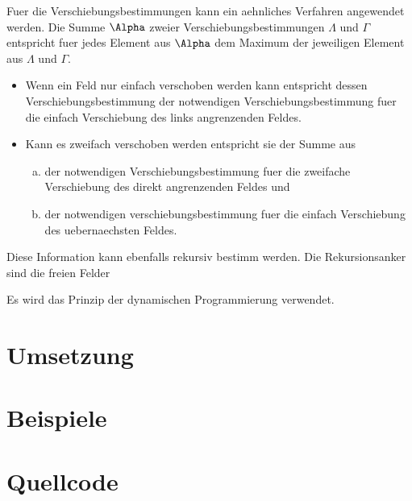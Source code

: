 \documentclass[a4paper,10pt,ngerman]{scrartcl}
\begin{document}
Fuer die Verschiebungsbestimmungen kann ein aehnliches Verfahren angewendet werden.
Die Summe $\Alpha$ zweier Verschiebungsbestimmungen $\Lambda$ und $\Gamma$ entspricht fuer jedes Element aus $\Alpha$ dem Maximum der jeweiligen Element aus $\Lambda$ und $\Gamma$.
\begin{itemize}
    \item Wenn ein Feld nur einfach verschoben werden kann entspricht dessen Verschiebungsbestimmung der notwendigen Verschiebungsbestimmung fuer die einfach Verschiebung des links angrenzenden Feldes.
    \item Kann es zweifach verschoben werden entspricht sie der Summe aus
          \begin{enumerate}[a)]
              \item der notwendigen Verschiebungsbestimmung fuer die zweifache Verschiebung des direkt angrenzenden Feldes und
              \item der notwendigen verschiebungsbestimmung fuer die einfach Verschiebung des uebernaechsten Feldes.
          \end{enumerate}
\end{itemize}
Diese Information kann ebenfalls rekursiv bestimm werden.
Die Rekursionsanker sind die freien Felder

Es wird das Prinzip der dynamischen Programmierung verwendet.

\section{Umsetzung}

\section{Beispiele}

\section{Quellcode}
\end{document}
